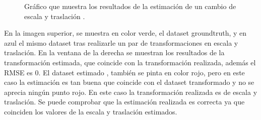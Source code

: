 \begin{figure}[H]
\begin{center}
\hspace{0.5cm}

\end{center}

\caption{Gráfico que muestra los resultados de la estimación de un cambio de escala y traslación .}
\end{figure}

En la imagen superior, se muestra en color verde, el dataset groundtruth, y en azul el mismo dataset tras realizarle un par de transformaciones en escala y traslación.
En la ventana de la derecha se muestran los resultados de la transformación estimada, que coincide con la transformación realizada, además el RMSE es 0.
El dataset estimado , también se pinta en color rojo, pero en este caso la estimación es tan buena que coincide con el dataset transformado y no se aprecia ningún punto rojo.
En este caso la transformación realizada es de escala y traslación. Se puede comprobar que la estimación realizada es correcta ya que coinciden los valores de la escala y traslación estimados.



